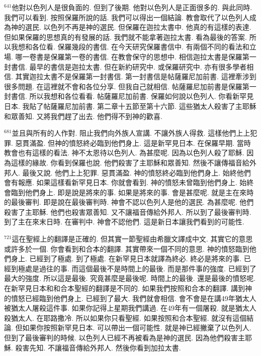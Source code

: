 \documentclass{book}
\begin{document}
$^{641}$他對以色列人是很負面的.
但到了後期.
他對以色列人是正面很多的.
與此同時.
我們可以看到.
按照保羅所說的話.
我們可以得出一個結論.
教會取代了以色列人成為神的選民.
以色列不再是神的選民.
但保羅在迦拉太書中.
他真的有這樣的表達.
但如果保羅的思想真的有發展的話.
我們就不能拿著迦拉太書.
看為最後的答案.
所以我想和各位看.
保羅幾段的書信.
在今天研究保羅書信中.
有兩個不同的看法和立場.
哪一卷書是保羅第一卷的書信.
在教會保守的思想中.
相信迦拉太書是保羅第一封書信.
最早的書信是迦拉太書.
但在新約研究中.
或保羅研究中.
亦有很多學者相信.
其實迦拉太書不是保羅第一封書信.
第一封書信是帖薩羅尼加前書.
這裡牽涉到很多問題.
在這裡就不會和各位分享.
但我自己就相信.
帖薩羅尼加前書是保羅第一封書信.
所以我想和各位看看.
帖薩羅尼加前書.
保羅如何說以色列人.
你看新罕見日本.
我貼了帖薩羅尼加前書.
第二章十五節至第十六節.
這些猶太人殺害了主耶穌和眾善知.
又將我們趕了出去.
他們得不到神的歡喜.

$^{681}$並且與所有的人作對.
阻止我們向外族人宣講.
不讓外族人得救.
這樣他們上上犯罪.
惡貫滿盈.
但神的憤怒終必臨到他們身上.
這是新罕見日本.
在保羅早期.
當時教會也有這樣的看法.
神不太恩待以色列人.
為甚麼呢.
因為以色列人殺了耶穌.
因為這樣的緣故.
你看到保羅也說.
他們殺害了主耶穌和眾善知.
然後不讓傳福音給外邦人.
最後又說.
他們上上犯罪.
惡貫滿盈.
神的憤怒終必臨到他們身上.
始終他們會有報應.
如果這樣看新罕見日本.
你就會看到.
神的憤怒未曾臨到他們身上.
始終會臨到他們身上.
即是說是將來的事.
如果是將來的事.
會是甚麼呢.
就是主在來時的最後審判.
即是說在最後審判時.
神會不認以色列人是他的選民.
為甚麼呢.
他們殺害了主耶穌.
他們也殺害眾善知.
又不讓福音傳給外邦人.
所以到了最後審判時.
到了主在來末日時.
在審判中.
神會不認他們.
這是新日本讓我們看到的可能性.

$^{721}$這在聖經上的翻譯是正確的.
但其實一節聖經由希臘文譯成中文.
其實它的意思或許多於一個.
你會看到和合本的翻譯.
其實帶來一個不同的意思.
神的憤怒臨到他們身上.
已經到了極處.
到了極處.
在新罕見日本就譯為終必.
終必是將來的事.
已經到極處是過往的事.
而這個最後不是時間上的最後.
而是那件事的強度.
已經到了最大的強度.
所以這是最後.
究竟甚麼是最後呢.
時間上的最後.
還是最後的憤怒呢.
在新罕見日本和和合本聖經的翻譯是不同的.
如果我們按照和合本的翻譯.
講到神的憤怒已經臨到他們身上.
已經到了最大.
我們就會相信.
會不會是在講49年猶太人被猶太人屠殺這件事.
如果你記得上星期我們講過.
在49年有一個屠殺.
就是猶太人殺猶太人.
在耶路撒冷.
所以如果你只看聖經.
如果按照和合本聖經.
就沒有這個結論.
但如果你按照新罕見日本.
可以帶出一個可能性.
就是神已經撇棄了以色列人.
但到了最後審判的時候.
以色列人已經不再被看為是神的選民.
因為他們殺害主耶穌.
殺害先知.
不讓福音傳給外邦人.
然後你看到加拉太書.
\end{document}
